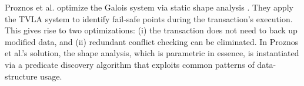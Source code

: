 Proznos et al. \cite{POPL11} optimize the Galois system \cite{KulkarniGalois} via static shape analysis \cite{SagivShapeAnalysis}. They apply the TVLA system to identify fail-safe points during the transaction's execution. This gives rise to two optimizations: (i) the transaction does not need to back up modified data, and (ii) redundant conflict checking can be eliminated. In Proznos et al.'s solution, the shape analysis, which is parametric in essence, is instantiated via a predicate discovery algorithm that exploits common patterns of data-structure usage.



